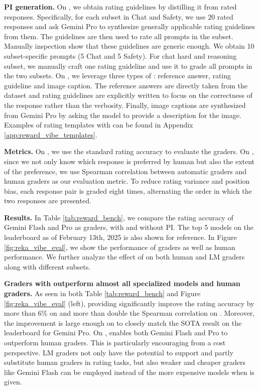 

\textbf{PI generation.} On \RewardBench, we obtain rating guidelines by distilling it from rated responses. Specifically, for each subset in Chat and Safety, we use 20 rated responses and ask Gemini Pro to synthesize generally applicable rating guidelines from them. The guidelines are then used to rate all prompts in the subset. Manually inspection show that these guidelines are generic enough. We obtain 10 subset-specific prompts (5 Chat and 5 Safety). For chat hard and reasoning subset, we manually craft one rating guideline and use it to grade all prompts in the two subsets. On \VibeEval, we leverage three types of \PI: reference answer, rating guideline and image caption. The reference answers are directly taken from the dataset and rating guidelines are explicitly written to focus on the correctness of the response rather than the verbosity. Finally, image captions are synthesized from Gemini Pro by asking the model to provide a description for the image. Examples of rating templates with \PI can be found in Appendix \ref{app:reward_vibe_templates}.

\textbf{Metrics.} On \RewardBench, we use the standard rating accuracy to evaluate the graders. On \VibeEval, since we not only know which response is preferred by human but also the extent of the preference, we use Spearman correlation between automatic graders and human graders as our evaluation metric. To reduce rating variance and position bias, each response pair is graded eight times, alternating the order in which the two responses are presented.

\textbf{Results.} In Table \ref{tab:reward_bench}, we compare the rating accuracy of Gemini Flash and Pro as graders, with and without PI. The top 5 models on the leaderboard as of February 13th, 2025 is also shown for reference. In Figure \ref{fig:reka_vibe_eval}, we show the performance of graders as well as human performance. We further analyze the effect of \PI on both human and LM graders along with different subsets.

\textbf{Graders with \PI outperform almost all specialized models and human graders.} As seen in both Table \ref{tab:reward_bench} and Figure \ref{fig:reka_vibe_eval} (left), providing \PI significantly improve the rating accuracy by more than 6\% on \RewardBench and more than double the Spearman correlation on \VibeEval. Moreover, the improvement is large enough on \RewardBench to closely match the SOTA result on the leaderboard for Gemini Pro. On \VibeEval, \PI enables both Gemini Flash and Pro to outperform human graders. This is particularly encouraging from a cost perspective. LM graders not only have the potential to support and partly substitute human graders in rating tasks, but also weaker and cheaper graders like Gemini Flash can be employed instead of the more expensive models when \PI is given.

